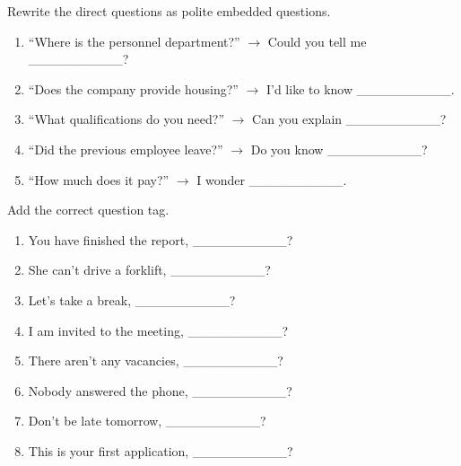 \documentclass[11pt]{article}
\begin{document}
\begin{exercice}
Rewrite the direct questions as polite embedded questions.
\begin{enumerate}
    \item ``Where is the personnel department?'' $\rightarrow$ Could you tell me \_\_\_\_\_\_\_\_\_\_?
    \item ``Does the company provide housing?'' $\rightarrow$ I'd like to know \_\_\_\_\_\_\_\_\_\_.
    \item ``What qualifications do you need?'' $\rightarrow$ Can you explain \_\_\_\_\_\_\_\_\_\_?
    \item ``Did the previous employee leave?'' $\rightarrow$ Do you know \_\_\_\_\_\_\_\_\_\_?
    \item ``How much does it pay?'' $\rightarrow$ I wonder \_\_\_\_\_\_\_\_\_\_.
\end{enumerate}
\end{exercice}

\begin{exercice}
Add the correct question tag.
\begin{enumerate}
    \item You have finished the report, \_\_\_\_\_\_\_\_\_\_?
    \item She can't drive a forklift, \_\_\_\_\_\_\_\_\_\_?
    \item Let's take a break, \_\_\_\_\_\_\_\_\_\_?
    \item I am invited to the meeting, \_\_\_\_\_\_\_\_\_\_?
    \item There aren't any vacancies, \_\_\_\_\_\_\_\_\_\_?
    \item Nobody answered the phone, \_\_\_\_\_\_\_\_\_\_?
    \item Don't be late tomorrow, \_\_\_\_\_\_\_\_\_\_?
    \item This is your first application, \_\_\_\_\_\_\_\_\_\_?
\end{enumerate}
\end{exercice}
\end{document}
